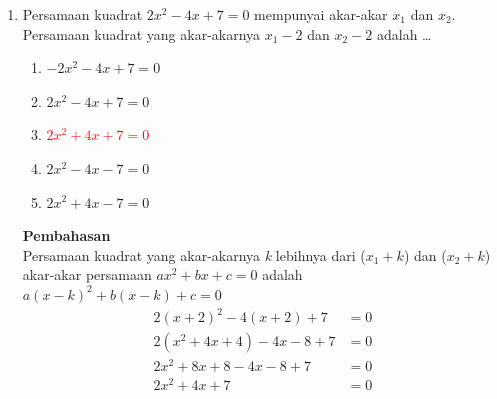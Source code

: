 \documentclass{report}
\newcommand{\options}[5]{
\begin{enumerate}[label=\alph*.]
	\item #1
	\item #2
	\item #3
	\item #4
	\item #5
\end{enumerate}
}
\newcommand{\pemb}{ \textbf{Pembahasan} \\}
\begin{document}
\begin{enumerate}
\item Persamaan kuadrat $2x^2-4x+7=0$ mempunyai akar-akar $x_{1}$ dan $x_{2}$. Persamaan kuadrat yang akar-akarnya $x_{1} - 2$ dan $x_{2} - 2$ adalah \ldots
\options
{$-2x^2-4x+7=0$}
{$2x^2-4x+7=0$}
{\textcolor{red}{$2x^2+4x+7=0$}}
{$2x^2-4x-7=0$}
{$2x^2+4x-7=0$}
\pemb
Persamaan kuadrat yang akar-akarnya \emph{k} lebihnya dari ($x_{1}+k$) dan ($x_{2}+k$) akar-akar persamaan $ax^2+bx+c=0$ adalah $a(x-k)^2+b(x-k)+c=0$
\begin{align*}
	2(x+2)^2-4(x+2)+7 &= 0 \\
	2(x^2+4x+4)-4x-8+7 &= 0 \\
	2x^2+8x+8-4x-8+7 &= 0 \\
	2x^2+4x+7 &= 0 \\
\end{align*}
\end{enumerate}
\end{document}
